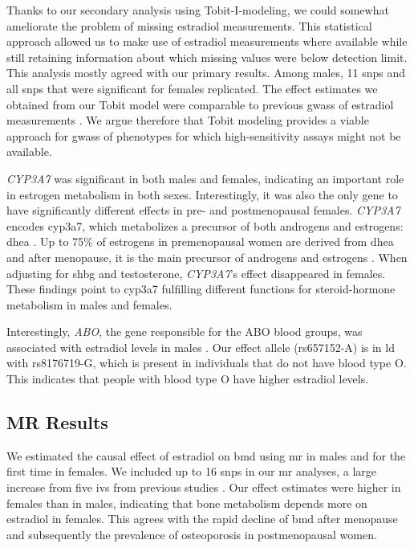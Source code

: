\documentclass[draft, twoside=false]{scrbook}
\begin{document}
Thanks to our secondary analysis using Tobit-I-modeling, we could somewhat ameliorate the problem of missing estradiol measurements.
This statistical approach allowed us to make use of estradiol measurements where available while still retaining information about which missing values were below detection limit.
This analysis mostly agreed with our primary results.
Among males, 11 \glspl{snp} and all \glspl{snp} that were significant for females replicated.
The effect estimates we obtained from our Tobit model were comparable to previous \glspl{gwas} of estradiol measurements \cite{Prescott2012f, Eriksson2018b,Pott2019e}.
We argue therefore that Tobit modeling provides a viable approach for \glspl{gwas} of phenotypes for which high-sensitivity assays might not be available.

\textit{CYP3A7} was significant in both males and females, indicating an important role in estrogen metabolism in both sexes.
Interestingly, it was also the only gene to have significantly different effects in pre- and postmenopausal females.
\textit{CYP3A7} encodes \gls{cyp3a7}, which metabolizes a precursor of both androgens and estrogens: \gls{dhea} \cite{Ohmori1998}.
Up to 75\% of estrogens in premenopausal women are derived from \gls{dhea} and after menopause, it is the main precursor of androgens and estrogens \cite{Simpson2001}.
When adjusting for \gls{shbg} and testosterone, \textit{CYP3A7}'s effect disappeared in females.
These findings point to \gls{cyp3a7} fulfilling different functions for steroid-hormone metabolism in males and females.

Interestingly, \textit{ABO}, the gene responsible for the ABO blood groups, was associated with estradiol levels in males \cite{Ogasawara1996}.
Our effect allele (rs657152-A) is in \gls{ld} with rs8176719-G, which is present in individuals that do not have blood type O.
This indicates that people with blood type O have higher estradiol levels.

\subsection{MR Results}
We estimated the causal effect of estradiol on \gls{bmd} using \gls{mr} in males and for the first time in females.
We included up to 16 \glspl{snp} in our \gls{mr} analyses, a large increase from five \glspl{iv} from previous studies \cite{Nethander2018a}.
Our effect estimates were higher in females than in males, indicating that bone metabolism depends more on estradiol in females.
This agrees with the rapid decline of \gls{bmd} after menopause and subsequently the prevalence of osteoporosis in postmenopausal women.
\end{document}
